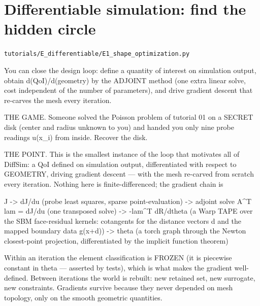 \chapter{Differentiable simulation: find the hidden circle}
\label{ch:E1_shape_optimization}
\noindent\texttt{tutorials/E\_differentiable/E1\_shape\_optimization.py}\\[0.75em]
\begin{outcome}
You can close the design loop: define a quantity of
interest on simulation output, obtain d(QoI)/d(geometry) by the ADJOINT
method (one extra linear solve, cost independent of the number of
parameters), and drive gradient descent that re-carves the mesh every
iteration.

THE GAME. Someone solved the Poisson problem of tutorial 01 on a SECRET disk
(center and radius unknown to you) and handed you only nine probe readings
u(x\_i) from inside. Recover the disk.

THE POINT. This is the smallest instance of the loop that motivates all of
DiffSim: a QoI defined on simulation output, differentiated with respect to
GEOMETRY, driving gradient descent — with the mesh re-carved from scratch
every iteration. Nothing here is finite-differenced; the gradient chain is

    J -> dJ/du            (probe least squares, sparse point-evaluation)
      -> adjoint solve    A\textasciicircum{}T lam = dJ/du        (one transposed solve)
      -> -lam\textasciicircum{}T dR/dtheta (a Warp TAPE over the SBM face-residual kernels:
                           cotangents for the distance vectors d and the
                           mapped boundary data g(x+d))
      -> theta            (a torch graph through the Newton closest-point
                           projection, differentiated by the implicit
                           function theorem)

Within an iteration the element classification is FROZEN (it is piecewise
constant in theta — asserted by tests), which is what makes the gradient
well-defined. Between iterations the world is rebuilt: new retained set, new
surrogate, new constraints. Gradients survive because they never depended on
mesh topology, only on the smooth geometric quantities.
\end{outcome}

